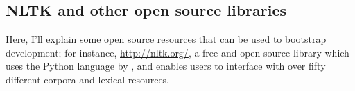 


\subsection{NLTK and other open source libraries}
\label{subsec:nltk}

Here, I'll explain some open source resources that can be used to bootstrap development; for instance, \href{NLTK (Natural Language Toolkit)}{http://nltk.org/}, a free and open source library which uses the Python language by \citet{bird2006nltk}, and enables users to interface with over fifty different corpora and lexical resources.




%
%

